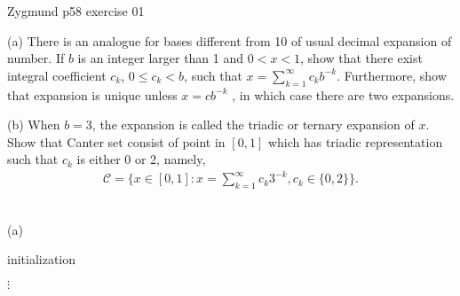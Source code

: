 \documentclass[UTF8,a4paper,10pt]{article}
\begin{document}

  \begin{Problem}[]{Zygmund p58 exercise 01}

    (a) There is an analogue for bases different from 10 of usual decimal expansion of number. If $b$ is an integer larger than 1 and $0 < x < 1$,
    show that there exist integral coefficient $c_k$, $0 \leq c_k < b$, such that $x = \sum_{k=1}^{\infty}c_k b^{-k}$. Furthermore, show that expansion is unique unless
    $x = cb^{-k}$
    , in which case there are two expansions.  


    (b) When $b = 3$, the expansion is called the triadic or ternary
    expansion of $x$. Show that Canter set consist of point in $[0,1]$ which has triadic representation such that $c_k$ is either 0 or 2, namely,
    \begin{equation*}
      \begin{aligned}
        \mathcal{C}  = \{x \in [0, 1] : x =\sum_{k=1}^{\infty}c_k 3^{-k}, c_k \in \{0, 2\}\}.
      \end{aligned}
    \end{equation*}
  \end{Problem}

  \begin{solution}\,\\

    (a)

    \begin{algorithm}[H]
      initialization\;
      \;
    \end{algorithm}
  \end{solution}

  \(\vdots\)
\end{document}
